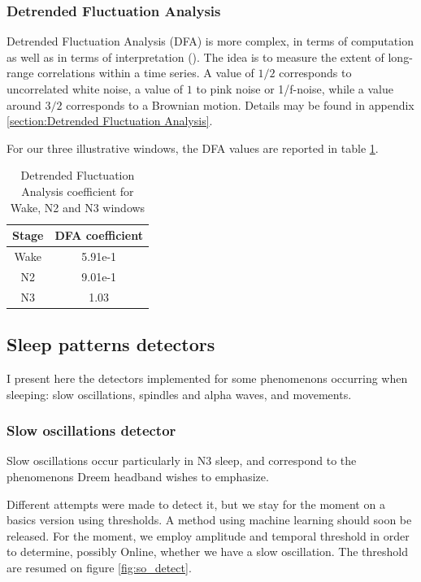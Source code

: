 \documentclass[12pt]{report}
\begin{document}
\subsubsection{Detrended Fluctuation Analysis}

Detrended Fluctuation Analysis (DFA) is more complex, in terms of computation as well as in terms of interpretation (\cite{morariu2007detrended}). The idea is to measure the extent of long-range correlations within a time series. A value of $1/2$ corresponds to uncorrelated white noise, a value of $1$ to pink noise or 1/f-noise, while a value around $3/2$ corresponds to a Brownian motion. Details may be found in appendix \ref{section:Detrended Fluctuation Analysis}.

For our three illustrative windows, the DFA values are reported in table \ref{tab:dfa}.

\begin{table}[H]
\centering
\begin{tabular}{c|c}
Stage & DFA coefficient \\\hline
Wake & 5.91e-1 \\
N2 & 9.01e-1 \\
N3 & 1.03 \\
\end{tabular}
\caption{\label{tab:dfa}Detrended Fluctuation Analysis coefficient for Wake, N2 and N3 windows}
\end{table}

\subsection{Sleep patterns detectors}

I present here the detectors implemented for some phenomenons occurring when sleeping: slow oscillations, spindles and alpha waves, and movements.

\subsubsection{Slow oscillations detector}

Slow oscillations occur particularly in N3 sleep, and correspond to the phenomenons Dreem headband wishes to emphasize. 

Different attempts were made to detect it, but we stay for the moment on a basics version using thresholds. A method using machine learning should soon be released. For the moment, we employ amplitude and temporal threshold in order to determine, possibly Online, whether we have a slow oscillation. The threshold are resumed on figure \ref{fig:so_detect}.
\end{document}

